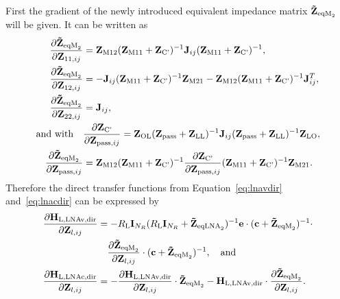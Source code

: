 First the gradient of the newly introduced equivalent impedance matrix $\mathbf{\tilde{Z}}_{\text{eqM}_2}$ will be given.
It can be written as
\begin{align}
\label{eq:HLNAM_lna_grad}
\frac{\partial\mat{\tilde{Z}}_{\text{eqM}_2}}{\partial\mat{Z}_{11,ij}}&=
\mat{Z}_\text{M12} (\mat{Z}_\text{M11} + \mat{Z}_\text{C'})^{-1}
	\mat{J}_{ij}(\mat{Z}_\text{M11} + \mat{Z}_\text{C'})^{-1},\\
\frac{\partial\mat{\tilde{Z}}_{\text{eqM}_2}}{\partial\mat{Z}_{12,ij}}&=
-\mat{J}_{ij} (\mat{Z}_\text{M11} + \mat{Z}_\text{C'})^{-1} \mat{Z}_\text{M21} 
	-\mat{Z}_\text{M12} (\mat{Z}_\text{M11} + \mat{Z}_\text{C'})^{-1} \mat{J}_{ij}^T,\\
\frac{\partial\mat{\tilde{Z}}_{\text{eqM}_2}}{\partial\mat{Z}_{22,ij}}&=\mat{J}_{ij},\\\nonumber
\text{and with}\quad&
\frac{\partial\mat{Z}_\text{C'}}{\partial\mat{Z}_{\text{pass},ij}} = 
\mat{Z}_\text{OL} (\mat{Z}_{\text{pass}}+\mat{Z}_\text{LL})^{-1} \mat{J}_{ij}
	(\mat{Z}_{\text{pass}}+\mat{Z}_\text{LL})^{-1} \mat{Z}_\text{LO},\\
\frac{\partial\mat{\tilde{Z}}_{\text{eqM}_2}}{\partial\mat{Z}_{\text{pass},ij}}&=
\mat{Z}_\text{M12} (\mat{Z}_\text{M11} + \mat{Z}_\text{C'})^{-1}
	\frac{\partial\mat{Z}_\text{C'}}{\partial\mat{Z}_{\text{pass},ij}}
	(\mat{Z}_\text{M11} + \mat{Z}_\text{C'})^{-1}\mat{Z}_\text{M21}.%
\end{align}
Therefore the direct transfer functions from Equation~\eqref{eq:lnavdir} and~\eqref{eq:lnacdir} can be expressed by
\begin{align}\label{eq:lnavdir_grad}\nonumber
\frac{\partial\mathbf{H}_\text{L,LNAv,dir}}{\partial\mathbf{Z}_{l,ij}} &=
	-R_\text{L}\mathbf{I}_{N_R}(R_\text{L}\mathbf{I}_{N_R} +
	\mathbf{\tilde{Z}}_{\text{eqLNA}_2})^{-1}\mathbf{e}\cdot
	(\mathbf{c}+\mathbf{\tilde{Z}}_{\text{eqM}_2})^{-1}\cdot\\
&\quad	\frac{\partial\mathbf{\tilde{Z}}_{\text{eqM}_2}}{\partial\mathbf{Z}_{l,ij}}\cdot
	(\mathbf{c}+\mathbf{\tilde{Z}}_{\text{eqM}_2})^{-1},\quad\text{and}\\\label{eq:lnacdir_grad}
\frac{\partial\mathbf{H}_\text{L,LNAc,dir}}{\partial\mathbf{Z}_{l,ij}} &=
	-\frac{\partial\mathbf{H}_\text{L,LNAv,dir}}{\partial\mathbf{Z}_{l,ij}}\cdot
	\mathbf{\tilde{Z}}_{\text{eqM}_2} -
	\mathbf{H}_\text{L,LNAv,dir}\cdot
	\frac{\partial\mathbf{\tilde{Z}}_{\text{eqM}_2}}{\partial\mathbf{Z}_{l,ij}}.
\end{align}


